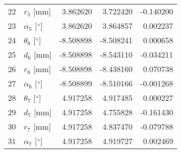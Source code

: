 \documentclass{standalone}%
\begin{document}
\begin{tabular}{llrrr}
22 &              $r_{5}$ [mm] &  3.862620 &   3.722420 &  -0.140200 \\
23 &  $\alpha_{5}$ [$\degree$] &  3.862620 &   3.864857 &   0.002237 \\
24 &  $\theta_{6}$ [$\degree$] & -8.508898 &  -8.508241 &   0.000658 \\
25 &              $d_{6}$ [mm] & -8.508898 &  -8.543110 &  -0.034211 \\
26 &              $r_{6}$ [mm] & -8.508898 &  -8.438160 &   0.070738 \\
27 &  $\alpha_{6}$ [$\degree$] & -8.508899 &  -8.510166 &  -0.001268 \\
28 &  $\theta_{7}$ [$\degree$] &  4.917258 &   4.917485 &   0.000227 \\
29 &              $d_{7}$ [mm] &  4.917258 &   4.755828 &  -0.161430 \\
30 &              $r_{7}$ [mm] &  4.917258 &   4.837470 &  -0.079788 \\
31 &  $\alpha_{7}$ [$\degree$] &  4.917258 &   4.919727 &   0.002469 \\
\bottomrule
\end{tabular}
%
\end{document}
